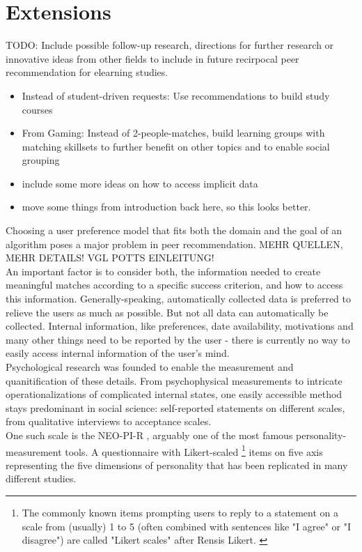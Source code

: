 \documentclass[nochapterpage,bigchapter,linedtoc,longdoc,colorback,accentcolor=tud3b,oneside]{tudreport}
\begin{document}
\chapter{Extensions} \label{extensions}
TODO: Include possible follow-up research, directions for further research or innovative ideas from other fields to include in future recirpocal peer recommendation for elearning studies.\\
\begin{itemize}
	\item Instead of student-driven requests: Use recommendations to build study courses
	\item From Gaming: Instead of 2-people-matches, build learning groups with matching skillsets to further benefit on other topics and to enable social grouping\\
	\item include some more ideas on how to access implicit data
	\item move some things from introduction back here, so this looks better.
\end{itemize}
Choosing a user preference model that fits both the domain and the goal of an algorithm poses a major problem in peer recommendation. \cite{potts2018reciprocal, olakanmi2017group} MEHR QUELLEN, MEHR DETAILS! VGL POTTS EINLEITUNG!\\
An important factor is to consider both, the information needed to create meaningful matches according to a specific success criterion, and how to access this information. Generally-speaking, automatically collected data is preferred to relieve the users as much as possible. But not all data can automatically be collected. Internal information, like preferences, date availability, motivations and many other things need to be reported by the user - there is currently no way to easily access internal information of the user's mind.\\
Psychological research was founded to enable the measurement and quanitification of these details. From psychophysical measurements to intricate operationalizations of complicated internal states, one easily accessible method stays predominant in social science: self-reported statements on different scales, from qualitative interviews to acceptance scales.\\
One such scale is the NEO-PI-R \cite{ostendorf2004neo}, arguably one of the most famous personality-measurement tools. A questionnaire with Likert-scaled \footnote{The commonly known items prompting users to reply to a statement on a scale from (usually) 1 to 5 (often combined with sentences like "I agree" or "I disagree") are called "Likert scales" after Rensis Likert. \cite{likert1932technique}} items on five axis representing the five dimensions of personality that has been replicated in many different studies. \cite{mccrae1987validation, goldberg1990alternative}\\
\end{document}
